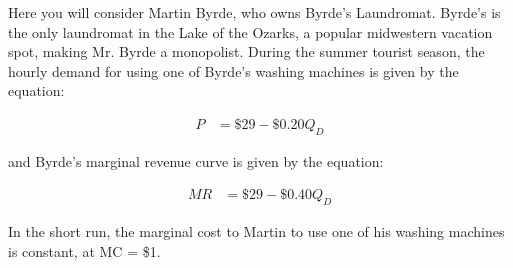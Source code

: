 \documentclass{article}
\begin{document}
Here you will consider Martin Byrde, who owns Byrde's Laundromat. Byrde's is the only laundromat in the Lake of the Ozarks, a popular midwestern vacation spot, making Mr. Byrde a monopolist. During the summer tourist season, the hourly demand for using one of Byrde's washing machines is given by the equation:

\begin{align*}
    P &= \$29 - \$0.20Q_D
\end{align*}

and Byrde's marginal revenue curve is given by the equation:

\begin{align*}
    MR &= \$29 - \$0.40Q_D
\end{align*}

In the short run, the marginal cost to Martin to use one of his washing machines is constant, at MC = \$1.
\end{document}
